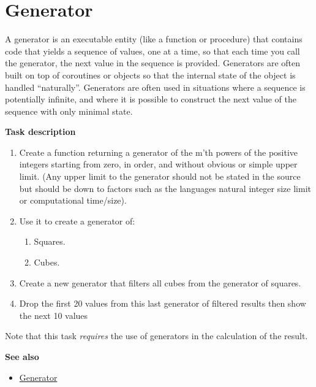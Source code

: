 \pagebreak{}
\section*{Generator}

A generator is an executable entity (like a function or procedure) that
contains code that yields a sequence of values, one at a time, so that
each time you call the generator, the next value in the sequence is
provided. Generators are often built on top of coroutines or objects so
that the internal state of the object is handled ``naturally''.
Generators are often used in situations where a sequence is potentially
infinite, and where it is possible to construct the next value of the
sequence with only minimal state.

\textbf{Task description}

\begin{enumerate}
\item
  Create a function returning a generator of the m'th powers of the
  positive integers starting from zero, in order, and without obvious or
  simple upper limit. (Any upper limit to the generator should not be
  stated in the source but should be down to factors such as the
  languages natural integer size limit or computational time/size).
\item
  Use it to create a generator of:

\begin{enumerate}
\item
  Squares.
\item
  Cubes.
\end{enumerate}

\item
  Create a new generator that filters all cubes from the generator of
  squares.
\item
  Drop the first 20 values from this last generator of filtered results
  then show the next 10 values
\end{enumerate}

Note that this task \emph{requires} the use of generators in the
calculation of the result.

\textbf{See also}

\begin{itemize}
\item
  \href{http://en.wikipedia.org/wiki/Generator\_(computer\_science)}{Generator}
\end{itemize}


